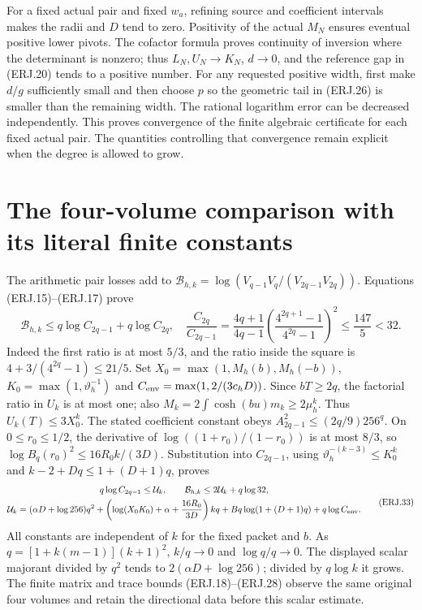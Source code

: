 \documentclass[11pt]{article}
\begin{document}
For a fixed actual pair and fixed $w_a$, refining source and coefficient
intervals makes the radii and $D$ tend to zero. Positivity of the
actual $M_N$ ensures eventual positive lower pivots. The cofactor
formula proves continuity of inversion where the determinant is
nonzero; thus $L_N,U_N\to K_N$, $d\to0$, and the reference gap
in (ERJ.20) tends to a positive number. For any requested positive
width, first make $d/g$ sufficiently small and then choose $p$ so
the geometric tail in (ERJ.26) is smaller than the remaining width.
The rational logarithm error can be decreased independently. This
proves convergence of the finite algebraic certificate for each fixed
actual pair. The quantities controlling that convergence remain
explicit when the degree is allowed to grow.

\section{The four-volume comparison with its literal finite constants}
The arithmetic pair losses add to
$\mathcal B_{h,k}=\log(V_{q-1}V_q/(V_{2q-1}V_{2q}))$.
Equations (ERJ.15)--(ERJ.17) prove
\[
 \mathcal B_{h,k}\le q\log C_{2q-1}+q\log C_{2q},\quad
 \frac{C_{2q}}{C_{2q-1}}
 =\frac{4q+1}{4q-1}
 \left(\frac{4^{2q+1}-1}{4^{2q}-1}\right)^2
 \le\frac{147}{5}<32.\tag{ERJ.32}
\]
Indeed the first ratio is at most $5/3$, and the ratio inside
the square is $4+3/(4^{2q}-1)\le21/5$.
Set $X_0=\max(1,M_h(b),M_h(-b))$,
$K_0=\max(1,\vartheta_h^{-1})$ and
$C_{\rm env}=\max(1,2/(3c_hD))$. Since $bT\ge2q$,
the factorial ratio in $U_k$ is at most one; also
$M_k=2\int\cosh(bu)m_k\ge2\mu_h^k$. Thus $U_k(T)\le3X_0^k$.
The stated coefficient constant obeys
$A_{2q-1}^2\le(2q/9)256^q$. On $0\le r_0\le1/2$,
the derivative of $\log((1+r_0)/(1-r_0))$ is at most $8/3$,
so $\log B_q(r_0)^2\le16R_0k/(3D)$.
Substitution into $C_{2q-1}$, using
$\vartheta_h^{-(k-3)}\le K_0^k$ and
$k-2+Dq\le1+(D+1)q$, proves
\[
\begin{gathered}
 q\log C_{2q-1}\le\mathcal U_k,\qquad
 \mathcal B_{h,k}\le2\mathcal U_k+q\log32,\\
 \mathcal U_k=(\alpha D+\log256)q^2
 +\left(\log(X_0K_0)+\alpha+\frac{16R_0}{3D}\right)kq
 +Bq\log(1+(D+1)q)+q\log C_{\rm env}.
\end{gathered}\tag{ERJ.33}
\]
All constants are independent of $k$ for the fixed packet and $b$.
As $q=[1+k(m-1)](k+1)^2$, $k/q\to0$ and $\log q/q\to0$.
The displayed scalar majorant divided by $q^2$ tends to
$2(\alpha D+\log256)$; divided by $q\log k$ it grows.
The finite matrix and trace bounds (ERJ.18)--(ERJ.28) observe the
same original four volumes and retain the directional data before
this scalar estimate.
\end{document}
